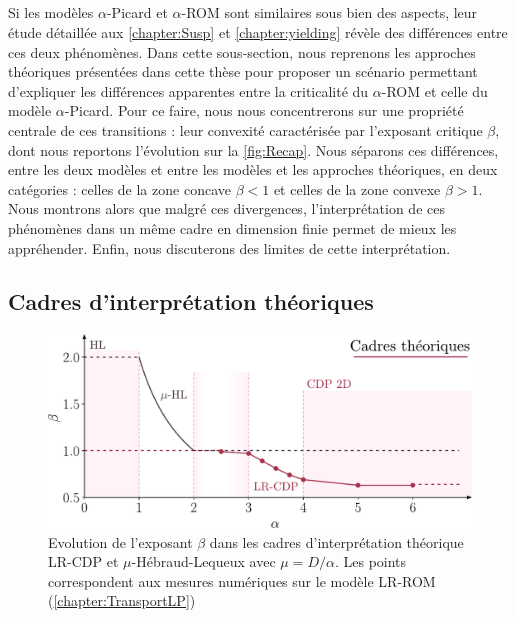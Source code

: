 \subparagraph{}Si les modèles $\alpha$-Picard et $\alpha$-ROM sont similaires sous bien des aspects, leur étude détaillée aux \autoref{chapter:Susp} et \autoref{chapter:yielding} révèle des différences entre ces deux phénomènes. Dans cette sous-section, nous reprenons les approches théoriques présentées dans cette thèse pour proposer un scénario permettant d'expliquer les différences apparentes entre la criticalité du $\alpha$-ROM et celle du modèle $\alpha$-Picard. Pour ce faire, nous nous concentrerons sur une propriété centrale de ces transitions : leur convexité caractérisée par l'exposant critique $\beta$, dont nous reportons l'évolution sur la \autoref{fig:Recap}. Nous séparons ces différences, entre les deux modèles et entre les modèles et les approches théoriques, en deux catégories : celles de la zone concave $\beta < 1$ et celles de la zone convexe $\beta > 1$. Nous montrons alors que malgré ces divergences, l'interprétation de ces phénomènes dans un même cadre en dimension finie permet de mieux les appréhender. Enfin, nous discuterons des limites de cette interprétation.

\label{sec:Diff}

\subsection{Cadres d'interprétation théoriques}

\begin{figure}[h]
	\centering
	\includegraphics[width=\textwidth]{Chapitre5/Figures/RecapTheory.pdf}
	\caption{Evolution de l'exposant $\beta$ dans les cadres d'interprétation théorique LR-CDP et $\mu$-Hébraud-Lequeux avec $\mu = D/\alpha$. Les points correspondent aux mesures numériques sur le modèle LR-ROM (\autoref{chapter:TransportLP})}
	\label{fig:RecapTheory}
\end{figure}

